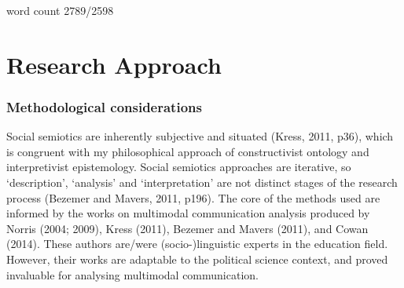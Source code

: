 \documentclass[a4paper, nobind]{templates/ociamthesis}
\begin{document}
\begin{romanpages}







\dominitoc %

\flushbottom




\end{romanpages}

\flushbottom

{word count 2789/2598}

\hypertarget{research-approach}{%
\chapter{Research Approach}\label{research-approach}}

\hypertarget{methodological-considerations}{%
\subsection*{Methodological considerations}\label{methodological-considerations}}

Social semiotics are inherently subjective and situated (Kress, 2011, p36), which is congruent with my philosophical approach of constructivist ontology and interpretivist epistemology. Social semiotics approaches are iterative, so `description', `analysis' and `interpretation' are not distinct stages of the research process (Bezemer and Mavers, 2011, p196). The core of the methods used are informed by the works on multimodal communication analysis produced by Norris (2004; 2009), Kress (2011), Bezemer and Mavers (2011), and Cowan (2014). These authors are/were (socio-)linguistic experts in the education field. However, their works are adaptable to the political science context, and proved invaluable for analysing multimodal communication.
\end{document}
